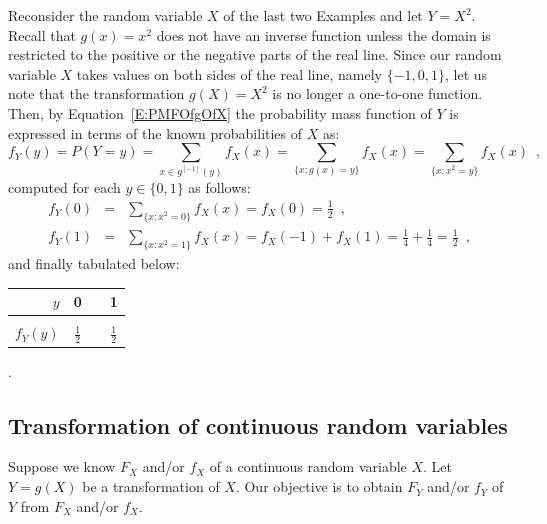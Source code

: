 \begin{example}
Reconsider the random variable $X$ of the last two Examples and let $Y=X^2$.  
Recall that $g(x)=x^2$ does not have an inverse function unless the domain is restricted to the positive or the negative parts of the real line.  
Since our random variable $X$ takes values on both sides of the real line, namely $\{-1,0,1\}$, let us note that the transformation $g(X)=X^2$ is no longer a one-to-one function.  
Then, by Equation~\eqref{E:PMFOfgOfX} the probability mass function of $Y$ is expressed in terms of the known probabilities of $X$ as:\\ 
\[
f_Y(y)=P(Y=y)= \sum_{x \in g^{[-1]}(y)} f_X(x)  = \sum_{\{x:g(x)=y\}} f_X(x) = \sum_{\{x:x^2=y\}} f_X(x) \enspace ,
\]
computed for each $y \in \{0,1\}$ as follows:
\begin{eqnarray*}
f_Y(0) &=& \sum_{\{x:x^2=0\}} f_X(x) = f_X(0)=\frac{1}{2} \enspace ,\\
f_Y(1) &=& \sum_{\{x:x^2=1\}} f_X(x) = f_X(-1)+f_X(1)=\frac{1}{4}+\frac{1}{4}=\frac{1}{2} \enspace ,
\end{eqnarray*}
and finally tabulated below:\\
\begin{center}
\begin{tabular}{r|ccc}
$y$ & 0 & & 1\\ \hline
 &  &  & \\ 
$f_Y(y)$ & $\frac{1}{2}$ & \quad & $\frac{1}{2}$
\end{tabular}\enspace .
\end{center}
\end{example}

\subsection{Transformation of continuous random variables}
Suppose we know $F_X$ and/or $f_X$ of a continuous random variable $X$.  
Let $Y=g(X)$ be a transformation of $X$.  
Our objective is to obtain $F_Y$ and/or $f_Y$ of $Y$ from $F_X$ and/or $f_X$.  

